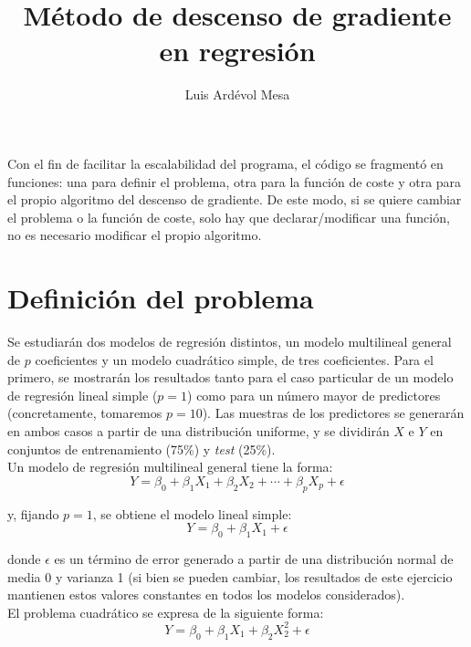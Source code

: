 \documentclass[11pt]{opticajnl}
\title{Método de descenso de gradiente en regresión}
\author[1,2,3]{Luis Ardévol Mesa}
\begin{document}
\maketitle

Con el fin de facilitar la escalabilidad del programa, el código se fragmentó en funciones: una para definir el problema, otra para la función de coste y otra para el propio algoritmo del descenso de gradiente. De este modo, si se quiere cambiar el problema o la función de coste, solo hay que declarar/modificar una función, no es necesario modificar el propio algoritmo.

\section{Definición del problema}

Se estudiarán dos modelos de regresión distintos, un modelo multilineal general de $p$ coeficientes y un modelo cuadrático simple, de tres coeficientes. Para el primero, se mostrarán los resultados tanto para el caso particular de un modelo de regresión lineal simple ($p = 1$) como para un número mayor de predictores (concretamente, tomaremos $p = 10$). Las muestras de los predictores se generarán en ambos casos a partir de una distribución uniforme, y se dividirán $X$ e $Y$ en conjuntos de entrenamiento (75\%) y \textit{test} (25\%). \\

\noindent Un modelo de regresión multilineal general tiene la forma: 
\begin{equation}
Y = \beta_0 + \beta_1X_1 + \beta_2X_2 + \cdots + \beta_pX_p + \epsilon 
\end{equation}

\noindent y, fijando $p=1$, se obtiene el modelo lineal simple:
\begin{equation}
Y = \beta_0 + \beta_1X_1 + \epsilon 
\end{equation}

\noindent donde $\epsilon$ es un término de error generado a partir de una distribución normal de media 0 y varianza 1 (si bien se pueden cambiar, los resultados de este ejercicio mantienen estos valores constantes en todos los modelos considerados). \\

\noindent El problema cuadrático se expresa de la siguiente forma:
\begin{equation}
    Y = \beta_0 + \beta_1 X_1 + \beta_2 X_2^2 + \epsilon
\end{equation}
\end{document}

